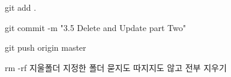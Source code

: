 git add .

git commit -m "3.5 Delete and Update part Two"

git push origin master

rm -rf 지울폴더
지정한 폴더 묻지도 따지지도 않고 전부 지우기